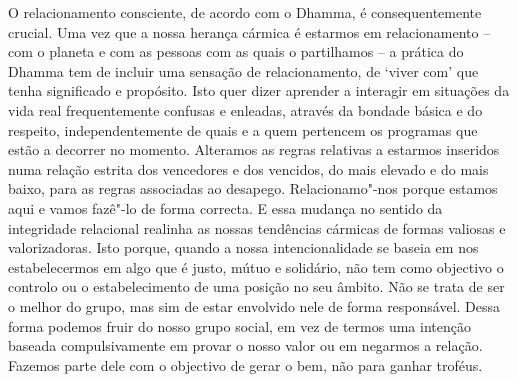 O relacionamento consciente, de acordo com o Dhamma, é consequentemente crucial.
Uma vez que a nossa herança cármica é estarmos em relacionamento -- com o
planeta e com as pessoas com as quais o partilhamos -- a prática do Dhamma tem
de incluir uma sensação de relacionamento, de `viver com' que tenha significado
e propósito. Isto quer dizer aprender a interagir em situações da vida real
frequentemente confusas e enleadas, através da bondade básica e do respeito,
independentemente de quais e a quem pertencem os programas que estão a decorrer
no momento. Alteramos as regras relativas a estarmos inseridos numa relação
estrita dos vencedores e dos vencidos, do mais elevado e do mais baixo, para as
regras associadas ao desapego. Relacionamo"-nos porque estamos aqui e vamos
fazê"-lo de forma correcta. E essa mudança no sentido da integridade relacional
realinha as nossas tendências cármicas de formas valiosas e valorizadoras. Isto
porque, quando a nossa intencionalidade se baseia em nos estabelecermos em algo
que é justo, mútuo e solidário, não tem como objectivo o controlo ou o
estabelecimento de uma posição no seu âmbito. Não se trata de ser o melhor do
grupo, mas sim de estar envolvido nele de forma responsável. Dessa forma podemos
fruir do nosso grupo social, em vez de termos uma intenção baseada
compulsivamente em provar o nosso valor ou em negarmos a relação. Fazemos parte
dele com o objectivo de gerar o bem, não para ganhar troféus.

